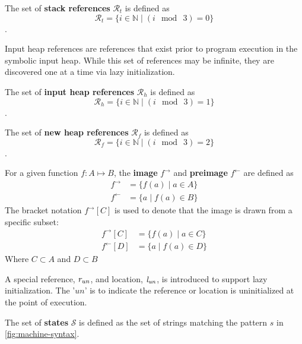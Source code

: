 \begin{definition}
The set of \textbf{stack references} $\mathcal{R}_t$ is defined as
 $$\mathcal{R}_t =\{i \in \mathbb{N} \mid ( i\ \bmod\ 3 ) = 0\}$$. 
\end{definition}

Input heap references are references that exist prior to program execution in the symbolic input heap. While this set of references may be infinite, they are discovered one at a time via lazy initialization.

\begin{definition}
The set of \textbf{input heap references} $\mathcal{R}_h$ is defined as
 $$\mathcal{R}_h =\{i \in \mathbb{N} \mid ( i\ \bmod\ 3 ) = 1\}$$. 
\end{definition}

\begin{definition}
The set of \textbf{new heap references} $\mathcal{R}_f$ is defined as
 $$\mathcal{R}_f =\{i \in \mathbb{N} \mid ( i\ \bmod\ 3 ) = 2\}$$. 
\end{definition}

\begin{definition}
For a given function $f:A \mapsto B$, the \textbf{image} $f^\rightarrow$ and \textbf{preimage} $f^\leftarrow$ are defined as
\begin{align}
 f^\rightarrow &= \{ f(a) \mid a \in A\}\\
 f^\leftarrow &= \{ a \mid f(a) \in B \}
 \end{align}
 The bracket notation $ f^\rightarrow [C] $ is used to denote that the image is drawn from a specific subset:
 \begin{align}
 f^\rightarrow [C] &= \{ f(a) \mid a \in C\}\\
 f^\leftarrow [D] &= \{ a \mid f(a) \in D \}
 \end{align}
 Where $C \subset A$ and $D \subset B$
\end{definition}

A special reference, $\emph{r}_\mathit{un}$, and location,
$\emph{l}_\mathit{un}$, is introduced to support lazy
initialization. The '$\mathit{un}$' is to indicate the reference or
location is uninitialized at the point of execution.


\begin{definition}
\label{def:state}
The set of \textbf{states} $\mathcal{S}$ is defined as the set of strings matching the pattern $s$ in \ref{fig:machine-syntax}.
\end{definition}

